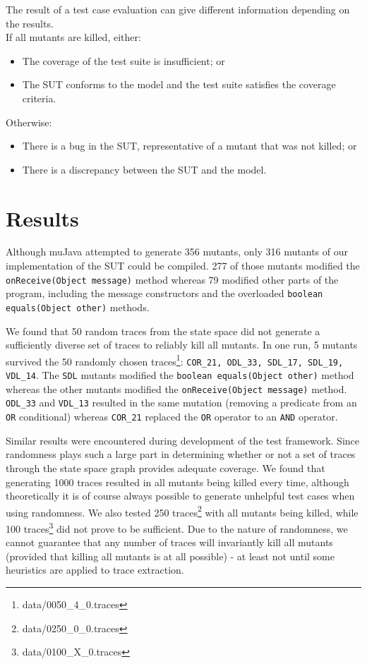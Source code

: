 \documentclass{article}
\begin{document}
			The result of a test case evaluation can give different information depending on the results. \\
			If all mutants are killed, either:
				\begin{itemize}
					\item The coverage of the test suite is insufficient; or
					\item The SUT conforms to the model and the test suite satisfies the coverage criteria.
				\end{itemize}
			Otherwise:
				\begin{itemize}
					\item There is a bug in the SUT, representative of a mutant that was not killed; or
					\item There is a discrepancy between the SUT and the model.
				\end{itemize}

	\section{Results}
		Although muJava attempted to generate 356 mutants, only 316 mutants of our implementation of the SUT could be compiled. 277 of those mutants modified the \texttt{onReceive(Object message)} method whereas 79 modified other parts of the program, including the message constructors and the overloaded \texttt{boolean equals(Object other)} methods.

		We found that 50 random traces from the state space did not generate a sufficiently diverse set of traces to reliably kill all mutants.
		In one run, 5 mutants survived the 50 randomly chosen traces\footnote{data/0050\_4\_0.traces}: \texttt{COR\_21, ODL\_33, SDL\_17, SDL\_19, VDL\_14}. The \texttt{SDL} mutants modified the \texttt{boolean equals(Object other)} method whereas the other mutants modified the \texttt{onReceive(Object message)} method. \texttt{ODL\_33} and \texttt{VDL\_13} resulted in the same mutation (removing a predicate from an \texttt{OR} conditional) whereas \texttt{COR\_21} replaced the \texttt{OR} operator to an \texttt{AND} operator.

		Similar results were encountered during development of the test framework. Since randomness plays such a large part in determining whether or not a set of traces through the state space graph provides adequate coverage. We found that generating 1000 traces resulted in all mutants being killed every time, although theoretically it is of course always possible to generate unhelpful test cases when using randomness. We also tested 250 traces\footnote{data/0250\_0\_0.traces} with all mutants being killed, while 100 traces\footnote{data/0100\_X\_0.traces} did not prove to be sufficient. Due to the nature of randomness, we cannot guarantee that any number of traces will invariantly kill all mutants (provided that killing all mutants is at all possible) \-- at least not until some heuristics are applied to trace extraction.
\end{document}
